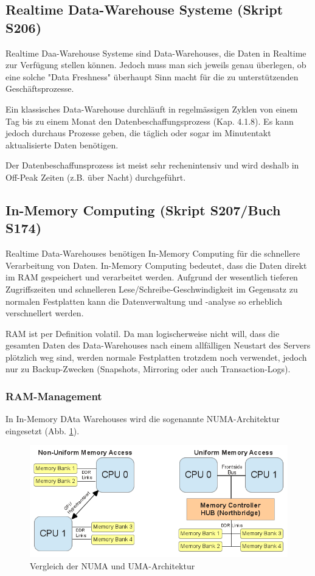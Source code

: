 \documentclass[a4paper, 11pt, nofootinbib]{article}
\begin{document}
\subsection{Realtime Data-Warehouse Systeme (Skript S206)}
Realtime Daa-Warehouse Systeme sind Data-Warehouses, die Daten in Realtime zur Verfügung stellen können. Jedoch muss man sich jeweils genau überlegen, ob eine solche "Data Freshness" überhaupt Sinn macht für die zu unterstützenden Geschäftsprozesse.

Ein klassisches Data-Warehouse durchläuft in regelmässigen Zyklen von einem Tag bis zu einem Monat den Datenbeschaffungsprozess (Kap. 4.1.8). Es kann jedoch durchaus Prozesse geben, die täglich oder sogar im Minutentakt aktualisierte Daten benötigen. 

Der Datenbeschaffunsprozess ist meist sehr rechenintensiv und wird deshalb in Off-Peak Zeiten (z.B. über Nacht) durchgeführt.

\subsection{In-Memory Computing (Skript S207/Buch S174)}
Realtime Data-Warehouses benötigen In-Memory Computing für die schnellere Verarbeitung von Daten. In-Memory Computing bedeutet, dass die Daten direkt im RAM gespeichert und verarbeitet werden. Aufgrund der wesentlich tieferen Zugriffszeiten und schnelleren Lese/Schreibe-Geschwindigkeit im Gegensatz zu normalen Festplatten kann die Datenverwaltung und -analyse so erheblich verschnellert werden.

RAM ist per Definition volatil. Da man logischerweise nicht will, dass die gesamten Daten des Data-Warehouses nach einem allfälligen Neustart des Servers plötzlich weg sind, werden normale Festplatten trotzdem noch verwendet, jedoch nur zu Backup-Zwecken (Snapshots, Mirroring oder auch Transaction-Logs).

\subsubsection{RAM-Management}
In In-Memory DAta Warehouses wird die sogenannte NUMA-Architektur eingesetzt (Abb. \ref{fig:numa}).

\begin{figure}[htb]
	\centering
	\includegraphics[keepaspectratio=true,height=10\baselineskip]{numa.png}
	\caption{Vergleich der NUMA und UMA-Architektur}
	\label{fig:numa}
\end{figure}
\end{document}
